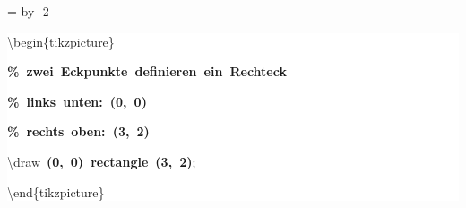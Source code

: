 \begingroup
\ttfamily
{}
=\textwidth
\advance{} by -2\fboxsep
\noindent
\colorbox{background}
{%
\parbox{\dimen255}
{%
\rule[-0.5ex]{0pt}{2.5ex}\hspace*{0.0em}\textbackslash{}begin\{tikzpicture\}\\
\rule[-0.5ex]{0pt}{2.5ex}\hspace*{1.0em}\textcolor{G}{\textbf{\%~zwei~Eckpunkte~definieren~ein~Rechteck}}\\
\rule[-0.5ex]{0pt}{2.5ex}\hspace*{1.0em}\textcolor{G}{\textbf{\%~links~unten:~(0,~0)}}\\
\rule[-0.5ex]{0pt}{2.5ex}\hspace*{1.0em}\textcolor{G}{\textbf{\%~rechts~oben:~(3,~2)}}\\
\rule[-0.5ex]{0pt}{2.5ex}\hspace*{1.0em}\textbackslash{}draw~\textcolor{R}{\textbf{(0,~0)~rectangle~(3,~2)}};\\
\rule[-0.5ex]{0pt}{2.5ex}\hspace*{0.0em}\textbackslash{}end\{tikzpicture\}}%
}%
\endgroup
